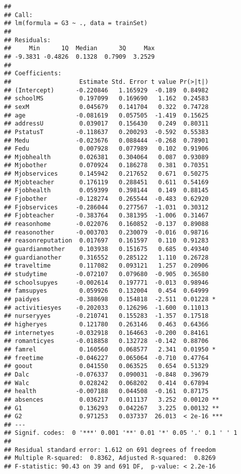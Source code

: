 \documentclass[
]{article}
\begin{document}
\begin{verbatim}
## 
## Call:
## lm(formula = G3 ~ ., data = trainSet)
## 
## Residuals:
##     Min      1Q  Median      3Q     Max 
## -9.3831 -0.4826  0.1328  0.7909  3.2529 
## 
## Coefficients:
##                   Estimate Std. Error t value Pr(>|t|)    
## (Intercept)      -0.220846   1.165929  -0.189  0.84982    
## schoolMS          0.197099   0.169690   1.162  0.24583    
## sexM              0.045679   0.141704   0.322  0.74728    
## age              -0.081619   0.057505  -1.419  0.15625    
## addressU          0.039017   0.156430   0.249  0.80311    
## PstatusT         -0.118637   0.200293  -0.592  0.55383    
## Medu             -0.023676   0.088444  -0.268  0.78901    
## Fedu              0.007928   0.077989   0.102  0.91906    
## Mjobhealth        0.026381   0.304064   0.087  0.93089    
## Mjobother         0.070924   0.186278   0.381  0.70351    
## Mjobservices      0.145942   0.217652   0.671  0.50275    
## Mjobteacher       0.176119   0.288451   0.611  0.54169    
## Fjobhealth        0.059399   0.398144   0.149  0.88145    
## Fjobother        -0.128274   0.265544  -0.483  0.62920    
## Fjobservices     -0.286044   0.277567  -1.031  0.30312    
## Fjobteacher      -0.383764   0.381395  -1.006  0.31467    
## reasonhome       -0.022076   0.160852  -0.137  0.89088    
## reasonother      -0.003703   0.230079  -0.016  0.98716    
## reasonreputation  0.017697   0.161597   0.110  0.91283    
## guardianmother    0.103938   0.151675   0.685  0.49340    
## guardianother     0.316552   0.285122   1.110  0.26728    
## traveltime        0.117082   0.093121   1.257  0.20906    
## studytime        -0.072107   0.079680  -0.905  0.36580    
## schoolsupyes     -0.002614   0.197771  -0.013  0.98946    
## famsupyes         0.059926   0.132004   0.454  0.64999    
## paidyes          -0.388698   0.154818  -2.511  0.01228 *  
## activitiesyes    -0.202033   0.126296  -1.600  0.11013    
## nurseryyes       -0.210741   0.155283  -1.357  0.17518    
## higheryes         0.121780   0.263146   0.463  0.64366    
## internetyes      -0.032918   0.164663  -0.200  0.84161    
## romanticyes      -0.018858   0.132728  -0.142  0.88706    
## famrel            0.160560   0.068577   2.341  0.01950 *  
## freetime         -0.046227   0.065064  -0.710  0.47764    
## goout             0.041550   0.063525   0.654  0.51329    
## Dalc             -0.076337   0.090031  -0.848  0.39679    
## Walc              0.028242   0.068202   0.414  0.67894    
## health           -0.007188   0.044508  -0.161  0.87175    
## absences          0.036217   0.011137   3.252  0.00120 ** 
## G1                0.136293   0.042267   3.225  0.00132 ** 
## G2                0.971253   0.037337  26.013  < 2e-16 ***
## ---
## Signif. codes:  0 '***' 0.001 '**' 0.01 '*' 0.05 '.' 0.1 ' ' 1
## 
## Residual standard error: 1.612 on 691 degrees of freedom
## Multiple R-squared:  0.8362, Adjusted R-squared:  0.8269 
## F-statistic: 90.43 on 39 and 691 DF,  p-value: < 2.2e-16
\end{verbatim}
\end{document}
